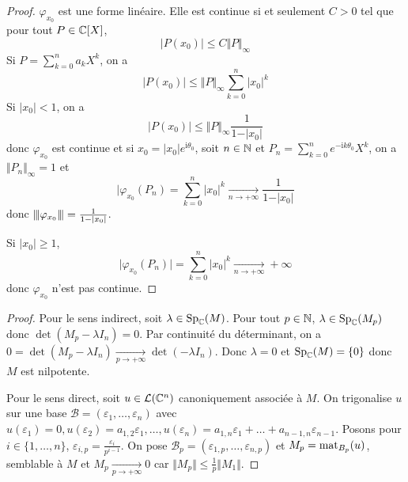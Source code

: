 \begin{proof}
	$\varphi_{x_{0}}$ est une forme linéaire. Elle est continue si et seulement $C>0$ tel que pour tout $P\in\mathbb{C}[X]$,
	\begin{equation}\vert P(x_{0})\vert\leqslant C\Vert P\Vert_{\infty}\end{equation}
	Si $P=\sum_{k=0}^{n}a_{k}X^{k}$, on a 
	\begin{equation}\vert P(x_{0})\vert\leqslant \Vert P\Vert_{\infty}\sum_{k=0}^{n}\vert x_{0}\vert^{k}\end{equation}
	Si $\vert x_{0}\vert<1$, on a 
	\begin{equation}\vert P(x_{0})\vert\leqslant \Vert P\Vert_{\infty}\frac{1}{1-\vert x_{0}\vert}\end{equation}
	donc $\varphi_{x_{0}}$ est continue et si $x_{0}=\vert x_{0}\vert e^{\mathrm{i}\theta_{0}}$, soit $n\in\mathbb{N}$ et $P_{n}=\sum_{k=0}^{n}e^{-\mathrm{i}k\theta_{0}}X^{k}$, on a $\Vert P_{n}\Vert_{\infty}=1$ et 
	\begin{equation}\vert \varphi_{x_{0}}(P_{n})=\sum_{k=0}^{n}\vert x_{0}\vert^{k}\xrightarrow[n\to+\infty]{}\frac{1}{1-\vert x_{0}\vert}\end{equation}
	donc ${\left\vert\kern-0.25ex\left\vert\kern-0.25ex\left\vert{}\varphi_{x_{0}} \right\vert\kern-0.25ex\right\vert\kern-0.25ex\right\vert}=\frac{1}{1-\vert x_{0}\vert}$.

	Si $\vert x_{0}\vert\geqslant1$, 
	\begin{equation}\vert\varphi_{x_0}(P_{n})\vert=\sum_{k=0}^{n}\vert x_{0}\vert^{k}\xrightarrow[n\to+\infty]{}+\infty\end{equation}
	donc $\varphi_{x_{0}}$ n'est pas continue.
\end{proof}

\begin{proof}
	Pour le sens indirect, soit $\lambda\in\operatorname{Sp}_{\mathbb{C}}(M)$. Pour tout $p\in\mathbb{N}$, $\lambda\in\operatorname{Sp}_{\mathbb{C}}(M_{p})$ donc $\det(M_{p}-\lambda I_{n})=0$. Par continuité du déterminant, on a $0=\det(M_{p}-\lambda I_{n})\xrightarrow[p\to+\infty]{}\det(-\lambda I_{n})$. Donc $\lambda=0$ et $\operatorname{Sp}_{\mathbb{C}}(M)=\{0\}$ donc $M$ est nilpotente.

	Pour le sens direct, soit $u\in\mathcal{L}(\mathbb{C}^{n})$ canoniquement associée à $M$. On trigonalise $u$ sur une base $\mathcal{B}=(\varepsilon_{1},\dots,\varepsilon_{n})$ avec $u(\varepsilon_{1})=0,u(\varepsilon_{2})=a_{1,2}\varepsilon_{1},\dots,u(\varepsilon_{n})=a_{1,n}\varepsilon_{1}+\dots+a_{n-1,n}\varepsilon_{n-1}$. Posons pour $i\in\{1,\dots,n\}$, $\varepsilon_{i,p}=\frac{\varepsilon_{i}}{p^{i-1}}$. On pose $\mathcal{B}_{p}=(\varepsilon_{1,p},\dots,\varepsilon_{n,p})$ et $M_{p}=\operatorname{mat}\limits_{B_{p}}(u)$, semblable à $M$ et $M_{p}\xrightarrow[p\to+\infty]{}0$ car $\Vert M_{p}\Vert\leqslant\frac{1}{p}\Vert M_{1}\Vert$.
\end{proof}

